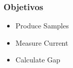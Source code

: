 \begin{frame}
\frametitle{Objetivos}

\begin{itemize}
	\item{Produce Samples}
	\item{Measure Current}
	\item{Calculate Gap}
\end{itemize}

\end{frame}
